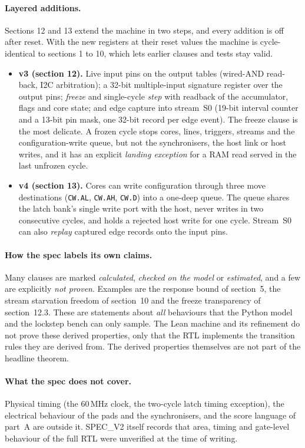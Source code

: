 \documentclass[11pt,a4paper]{article}
\newcommand{\brkus}{\textunderscore\allowbreak}
\newcommand{\code}[1]{{\let\_\brkus\texttt{#1}}}
\begin{document}
\paragraph{Layered additions.} Sections 12 and 13 extend the machine in two
steps, and every addition is off after reset. With the new registers at their
reset values the machine is cycle-identical to sections 1 to 10, which lets
earlier clauses and tests stay valid.
\begin{itemize}
\item \textbf{v3 (section 12).} Live input pins on the output tables
  (wired-AND read-back, I2C arbitration); a 32-bit multiple-input signature
  register over the output pins; \emph{freeze} and single-cycle \emph{step} with
  readback of the accumulator, flags and core state; and edge capture into
  stream~S0 (19-bit interval counter and a 13-bit pin mask, one 32-bit record
  per edge event). The freeze clause is the most delicate. A frozen cycle stops
  cores, lines, triggers, streams and the configuration-write queue, but not the
  synchronisers, the host link or host writes, and it has an explicit
  \emph{landing exception} for a RAM read served in the last unfrozen cycle.
\item \textbf{v4 (section 13).} Cores can write configuration through three
  move destinations (\code{CW.AL}, \code{CW.AH}, \code{CW.D}) into a one-deep
  queue. The queue shares the latch bank's single write port with the host, never
  writes in two consecutive cycles, and holds a rejected host write for one
  cycle. Stream~S0 can also \emph{replay} captured edge records onto the input
  pins.
\end{itemize}

\paragraph{How the spec labels its own claims.} Many clauses are marked
\emph{calculated}, \emph{checked on the model} or \emph{estimated}, and a few
are explicitly \emph{not proven}. Examples are the response bound of section~5,
the stream starvation freedom of section~10 and the freeze transparency of
section~12.3. These are statements about \emph{all} behaviours that the
Python model and the lockstep bench can only sample. The Lean machine and its
refinement do not prove these derived properties, only that the RTL implements
the transition rules they are derived from. The derived properties themselves
are not part of the headline theorem.

\paragraph{What the spec does not cover.} Physical timing (the 60\,MHz clock, the
two-cycle latch timing exception), the electrical behaviour of the pads and the
synchronisers, and the score language of part~A are outside it. SPEC\_V2 itself
records that area, timing and gate-level behaviour of the full RTL were
unverified at the time of writing.
\end{document}
